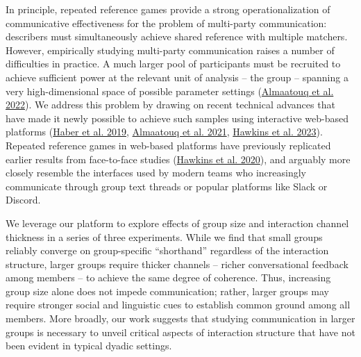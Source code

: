 \documentclass[
  english,
]{article}
\begin{document}
In principle, repeated reference games provide a strong operationalization of communicative effectiveness for the problem of multi-party communication: describers must simultaneously achieve shared reference with multiple matchers.
However, empirically studying multi-party communication raises a number of difficulties in practice.
A much larger pool of participants must be recruited to achieve sufficient power at the relevant unit of analysis -- the group -- spanning a very high-dimensional space of possible parameter settings (\protect\hyperlink{ref-almaatouq2022}{Almaatouq et al. 2022}).
We address this problem by drawing on recent technical advances that have made it newly possible to achieve such samples using interactive web-based platforms (\protect\hyperlink{ref-haber2019}{Haber et al. 2019}, \protect\hyperlink{ref-almaatouq2020empirica}{Almaatouq et al. 2021}, \protect\hyperlink{ref-hawkins2023partners}{Hawkins et al. 2023}).
Repeated reference games in web-based platforms have previously replicated earlier results from face-to-face studies (\protect\hyperlink{ref-hawkins2020}{Hawkins et al. 2020}), and arguably more closely resemble the interfaces used by modern teams who increasingly communicate through group text threads or popular platforms like Slack or Discord.

We leverage our platform to explore effects of group size and interaction channel thickness in a series of three experiments.
While we find that small groups reliably converge on group-specific ``shorthand'' regardless of the interaction structure, larger groups require thicker channels -- richer conversational feedback among members -- to achieve the same degree of coherence.
Thus, increasing group size alone does not impede communication; rather, larger groups may require stronger social and linguistic cues to establish common ground among all members.
More broadly, our work suggests that studying communication in larger groups is necessary to unveil critical aspects of interaction structure that have not been evident in typical dyadic settings.
\end{document}

